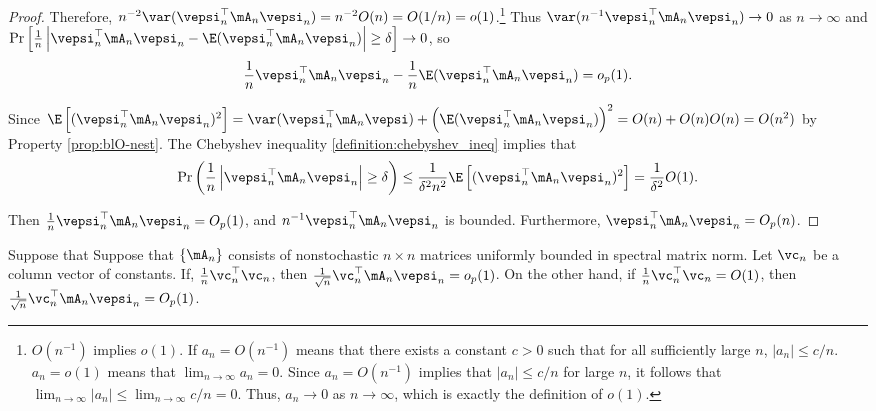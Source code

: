 \documentclass[english,12pt]{book}\usepackage[]{graphicx}\usepackage[]{xcolor}
\begin{document}
\begin{proof}
Therefore, $n^{-2}\var(\vepsi_n^\top \mA_n \vepsi_n) = n^{-2} O(n) = O(1/n) =o(1)$.\footnote{$O(n^{-1})$ implies $o(1)$. If $a_n =O(n^{-1})$ means that there exists a constant $c> 0$ such that for all sufficiently large $n$, $|a_n|\leq c/n$. $a_n =o(1)$ means that $\lim_{n\to\infty}a_n = 0$. Since $a_n =O(n^{-1})$ implies that $|a_n|\leq c/n$ for large $n$, it follows that $\lim_{n\to\infty}|a_n|\leq \lim_{n\to\infty}c/n = 0$. Thus, $a_n\to 0$ as $n\to\infty$, which is exactly the definition of $o(1)$.} Thus $\var(n^{-1}\vepsi_n^\top \mA_n \vepsi_n)\to 0$ as $n\to \infty$ and $\Pr\left[\frac{1}{n}\left|\vepsi_n^\top \mA_n \vepsi_n - \E(\vepsi_n^\top \mA_n \vepsi_n)\right|\geq \delta \right]\to 0$, so 
\begin{equation*}
\frac{1}{n}\vepsi_n^\top\mA_n\vepsi_n - \frac{1}{n}\E(\vepsi_n^\top \mA_n\vepsi_n) = o_p(1).
\end{equation*}

Since $\E\left[(\vepsi_n^\top\mA_n\vepsi_n)^2\right]= \var(\vepsi_n^\top\mA_n\vepsi) +  \left(\E(\vepsi_n^\top\mA_n\vepsi_n)\right)^2 = O(n) + O(n)O(n)= O(n^2)$ by Property \ref{prop:blO-nest}. The Chebyshev inequality \ref{definition:chebyshev_ineq} implies that
\begin{equation*}
\Pr\left(\frac{1}{n}\left|\vepsi_n^\top\mA_n\vepsi_n\right| \geq \delta\right) \leq \frac{1}{\delta^2n^2}\E\left[(\vepsi_n^\top\mA_n\vepsi_n)^2\right] = \frac{1}{\delta^2}O(1).
\end{equation*}

Then $\frac{1}{n}\vepsi^\top_n\mA_n\vepsi_n = O_p(1)$, and $n^{-1}\vepsi_n^\top\mA_n\vepsi_n$ is bounded. Furthermore, $\vepsi^\top_n\mA_n\vepsi_n = O_p(n)$.
\end{proof}

\begin{lemma} Suppose that 
Suppose that  $\left\lbrace \mA_n\right\rbrace$ consists of nonstochastic $n\times n$ matrices uniformly bounded in spectral matrix norm. Let $\vc_n$ be a column vector of constants. If, $\frac{1}{n}\vc_n^\top\vc_n$, then $\frac{1}{\sqrt{n}}\vc_n^\top\mA_n\vepsi_n = o_p(1)$. On the other hand, if $\frac{1}{n}\vc_n^\top\vc_n = O(1)$, then $\frac{1}{\sqrt{n}}\vc_n^\top\mA_n\vepsi_n=O_p(1)$.
\end{lemma}

% 
\end{document}
